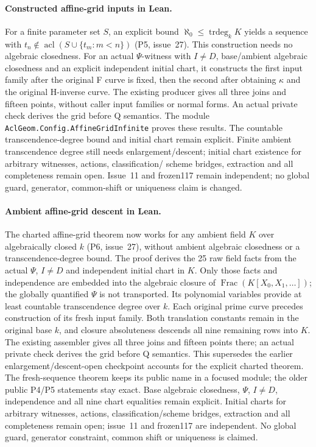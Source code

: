 \documentclass[11pt,oneside]{article}
\theoremstyle{definition}
\theoremstyle{remark}
\newcommand{\acl}{\operatorname{acl}}
\newcommand{\lean}[1]{\nolinkurl{#1}}
\begin{document}
\paragraph{Constructed affine-grid inputs in Lean.}
For a finite parameter set $S$, an explicit bound
$\aleph_0\le\operatorname{trdeg}_k K$ yields a sequence with
$t_n\notin\acl(S\cup\{t_m:m<n\})$ (P5, issue~27).
This construction needs no algebraic closedness. For an actual
$\Psi$-witness with $I\ne D$, base/ambient algebraic closedness and an
explicit independent initial chart, it constructs the first input family
after the original F curve is fixed, then the second after obtaining
$\kappa$ and the original H-inverse curve. The existing producer gives
all three joins and fifteen points, without caller input families or
normal forms. An actual private check derives the grid before Q semantics.
The module \lean{AclGeom.Config.AffineGridInfinite} proves these results.
The countable transcendence-degree bound and initial chart remain explicit.
Finite ambient transcendence degree still needs enlargement/descent;
initial chart existence for arbitrary witnesses, actions, classification/
scheme bridges, extraction and all completeness remain open. Issue~11 and
frozen117 remain independent; no global guard, generator, common-shift or
uniqueness claim is changed.

\clearpage
\paragraph{Ambient affine-grid descent in Lean.}
The charted affine-grid theorem now works for any ambient field $K$
over algebraically closed $k$ (P6, issue~27), without ambient algebraic
closedness or a transcendence-degree bound. The proof derives the 25 raw
field facts from the actual $\Psi$, $I\ne D$ and independent initial chart
in $K$. Only those facts and independence are embedded into the algebraic
closure of $\operatorname{Frac}(K[X_0,X_1,\ldots])$; the globally quantified
$\Psi$ is not transported. Its polynomial variables provide at least countable
transcendence degree over $k$. Each original prime curve precedes construction of
its fresh input family. Both translation constants remain in the original
base $k$, and closure absoluteness descends all nine remaining rows into $K$.
The existing assembler gives all three joins and fifteen points there;
an actual private check derives the grid before Q semantics.
This supersedes the earlier enlargement/descent-open checkpoint accounts
for the explicit charted theorem. The fresh-sequence theorem keeps its
public name in a focused module; the older public P4/P5 statements stay exact.
Base algebraic closedness, $\Psi$, $I\ne D$, independence and all nine chart
equalities remain explicit. Initial charts for arbitrary witnesses,
actions, classification/scheme bridges, extraction and all completeness
remain open; issue~11 and frozen117 are independent. No global guard,
generator constraint, common shift or uniqueness is claimed.
\end{document}
